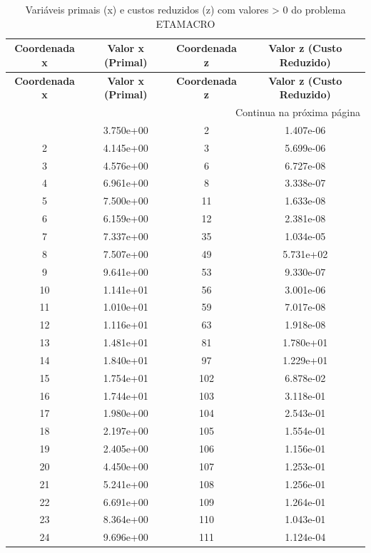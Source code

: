 \documentclass[12pt]{article}
\begin{document}
\begin{longtable}{@{}cccc@{}}
\caption{Variáveis primais (x) e custos reduzidos (z) com valores > 0 do problema ETAMACRO} \\
\toprule
\textbf{Coordenada x} & \textbf{Valor x (Primal)} & \textbf{Coordenada z} & \textbf{Valor z (Custo Reduzido)} \\
\midrule
\endfirsthead

\toprule
\textbf{Coordenada x} & \textbf{Valor x (Primal)} & \textbf{Coordenada z} & \textbf{Valor z (Custo Reduzido)} \\
\midrule
\endhead

\midrule \multicolumn{4}{r}{{Continua na próxima página}} \\ \midrule
\endfoot

\bottomrule
\endlastfoot
1 & 3.750e+00 & 2 & 1.407e-06 \\
2 & 4.145e+00 & 3 & 5.699e-06 \\
3 & 4.576e+00 & 6 & 6.727e-08 \\
4 & 6.961e+00 & 8 & 3.338e-07 \\
5 & 7.500e+00 & 11 & 1.633e-08 \\
6 & 6.159e+00 & 12 & 2.381e-08 \\
7 & 7.337e+00 & 35 & 1.034e-05 \\
8 & 7.507e+00 & 49 & 5.731e+02 \\
9 & 9.641e+00 & 53 & 9.330e-07 \\
10 & 1.141e+01 & 56 & 3.001e-06 \\
11 & 1.010e+01 & 59 & 7.017e-08 \\
12 & 1.116e+01 & 63 & 1.918e-08 \\
13 & 1.481e+01 & 81 & 1.780e+01 \\
14 & 1.840e+01 & 97 & 1.229e+01 \\
15 & 1.754e+01 & 102 & 6.878e-02 \\
16 & 1.744e+01 & 103 & 3.118e-01 \\
17 & 1.980e+00 & 104 & 2.543e-01 \\
18 & 2.197e+00 & 105 & 1.554e-01 \\
19 & 2.405e+00 & 106 & 1.156e-01 \\
20 & 4.450e+00 & 107 & 1.253e-01 \\
21 & 5.241e+00 & 108 & 1.256e-01 \\
22 & 6.691e+00 & 109 & 1.264e-01 \\
23 & 8.364e+00 & 110 & 1.043e-01 \\
24 & 9.696e+00 & 111 & 1.124e-04 \\

\end{longtable}
\end{document}
